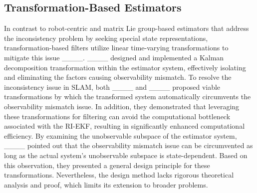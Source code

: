 
\subsection{Transformation-Based Estimators}

In contrast to robot-centric and matrix Lie group-based estimators that address the inconsistency problem by seeking special state representations, transformation-based filters utilize linear time-varying transformations to mitigate this issue ____. ____ designed and implemented a Kalman decomposition transformation within the estimator system, effectively isolating and eliminating the factors causing observability mismatch. To resolve the inconsistency issue in SLAM, both ____ and ____ proposed viable transformations by which the transformed system automatically circumvents the observability mismatch issue. In addition, they demonstrated that leveraging these transformations for filtering can avoid the computational bottleneck associated with the RI-EKF, resulting in significantly enhanced computational efficiency. By examining the unobservable subspace of the estimator system, ____ pointed out that the observability mismatch issue can be circumvented as long as the actual system's unobservable subspace is state-dependent. Based on this observation, they presented a general design principle for these transformations. Nevertheless, the design method lacks rigorous theoretical analysis and proof, which limits its extension to broader problems.



%